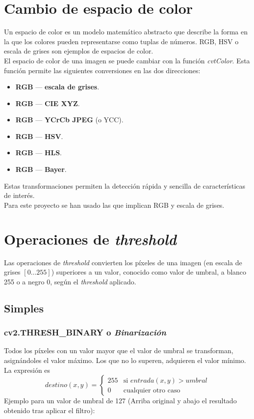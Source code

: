 \section{Cambio de espacio de color}\label{tecnica:cambio-color}
Un espacio de color es un modelo matemático abstracto que describe la
forma en la que los colores pueden representarse como tuplas de
números. RGB, HSV o escala de grises son ejemplos de espacios de color. \\
El espacio de color de una imagen se puede cambiar con la función
\emph{cvtColor}. Esta función permite las siguientes conversiones en
las dos direcciones:
\begin{itemize}
\item \textbf{RGB} --- \textbf{escala de grises}.
\item \textbf{RGB} --- \textbf{CIE XYZ}.
\item \textbf{RGB} --- \textbf{YCrCb JPEG} (o YCC).
\item \textbf{RGB} --- \textbf{HSV}.
\item \textbf{RGB} --- \textbf{HLS}.
\item \textbf{RGB} --- \textbf{Bayer}.
\end{itemize}
Estas transformaciones permiten la detección rápida y sencilla de
características de interés. \\
Para este proyecto se han usado las que implican RGB y escala de
grises.

\section{Operaciones de \emph{threshold}}
Las operaciones de \emph{threshold} convierten los píxeles de una
imagen (en escala de grises $\left[0 \dots 255\right]$) superiores a
un valor, conocido como valor de umbral, a blanco 255 o a negro 0,
según el \emph{threshold} aplicado.
\subsection{Simples}
\subsubsection{cv2.THRESH\_BINARY o
  \emph{Binarización}}\label{tecnica:threshold-binario}
Todos los píxeles con un valor mayor que el valor de umbral se
transforman, asignándoles el valor máximo. Los que no lo superen,
adquieren el valor mínimo.  La expresión es
\begin{equation*}
  destino(x, y) =
  \begin{cases}
    255 & \text{si } entrada(x, y) > umbral \\
    0 & \text{cualquier otro caso}
  \end{cases}
\end{equation*}
Ejemplo para un valor de umbral de 127 (Arriba original y abajo el
resultado obtenido tras aplicar el filtro):


